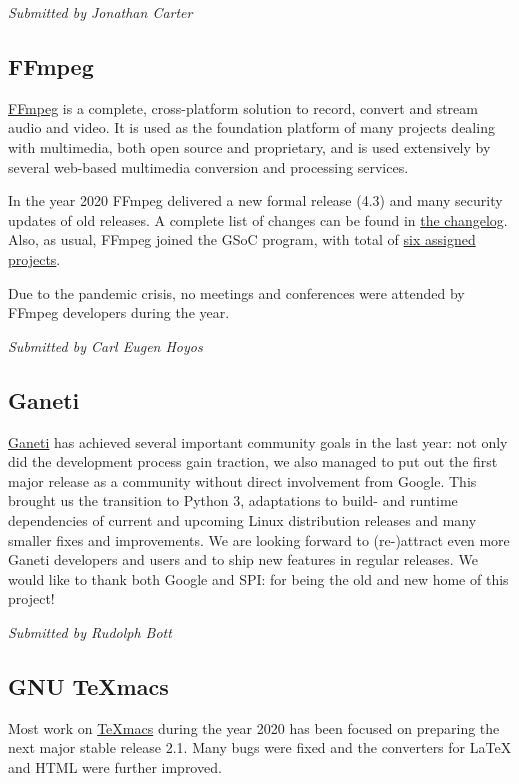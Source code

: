 \documentclass[a4paper]{report}
\begin{document}
{\em Submitted by Jonathan Carter}

\subsection{FFmpeg}

\href{https://www.ffmpeg.org/}{FFmpeg} is a complete, cross-platform solution to record, convert and stream audio and video. It is used as the foundation platform of many projects dealing with multimedia, both open source and proprietary, and is used extensively by several web-based multimedia conversion and processing services.

In the year 2020 FFmpeg delivered a new formal release (4.3) and many security updates of old releases. A complete list of changes can be found in \href{https://git.ffmpeg.org/gitweb/ffmpeg.git/blob/HEAD:/Changelog}{the changelog}.  Also, as usual, FFmpeg joined the GSoC program, with total of \href{https://trac.ffmpeg.org/wiki/SponsoringPrograms/GSoC/2020/Results}{six assigned projects}.

Due to the pandemic crisis, no meetings and conferences were attended by FFmpeg developers during the year.

{\em Submitted by Carl Eugen Hoyos}

\subsection{Ganeti}

\href{https://ganeti.org/}{Ganeti} has achieved several important community goals in the last year: not only did the development process gain traction, we also managed to put out the first major release as a community without direct involvement from Google. This brought us the transition to Python 3, adaptations to build- and runtime dependencies of current and upcoming Linux distribution releases and many smaller fixes and improvements. We are looking forward to (re-)attract even more Ganeti developers and users and to ship new features in regular releases. We would like to thank both Google and SPI: for being the old and new home of this project!

{\em Submitted by Rudolph Bott}

\subsection{GNU TeXmacs}

Most work on \href{https://www.texmacs.org/}{TeXmacs} during the year 2020 has been focused on preparing the next major stable release 2.1.  Many bugs were fixed and the converters for LaTeX and HTML were further improved.
\end{document}
